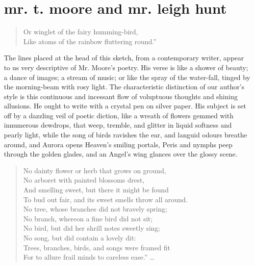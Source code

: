 \chapter[Mr. T. Moore and Mr. Leigh Hunt]
{mr. t. moore {\normalsize and} mr. leigh hunt}

\begin{verse}
  Or winglet of the fairy humming-bird,\\
  Like atoms of the rainbow fluttering round.''\\
\end{verse}

The lines placed at the head of this sketch, from a contemporary writer,
appear to us very descriptive of Mr. Moore's poetry. His verse is like
a shower of beauty; a dance of images; a stream of music; or like the
spray of the water-fall, tinged by the morning-beam with rosy light.
The characteristic distinction of our author's style is this continuous
and incessant flow of voluptuous thoughts and shining allusions. He
ought to write with a crystal pen on silver paper. His subject is set
off by a dazzling veil of poetic diction, like a wreath of flowers
gemmed with innumerous dewdrops, that weep, tremble, and glitter in
liquid softness and pearly light, while the song of birds ravishes
the ear, and languid odours breathe around, and Aurora opens Heaven's
smiling portals, Peris and nymphs peep through the golden glades, and an
Angel's wing glances over the glossy scene.
\begin{verse}
  No dainty flower or herb that grows on ground,\\
  No arboret with painted blossoms drest,\\
  And smelling sweet, but there it might be found\\
  To bud out fair, and its sweet smells throw all around.\\ 
\vspace{\stanzaskip}
  No tree, whose branches did not bravely spring;\\
  No branch, whereon a fine bird did not sit;\\
  No bird, but did her shrill notes sweetly sing;\\
  No song, but did contain a lovely dit:\\
  Trees, branches, birds, and songs were framed fit\\
  For to allure frail minds to careless ease.'' \dots
\end{verse}
